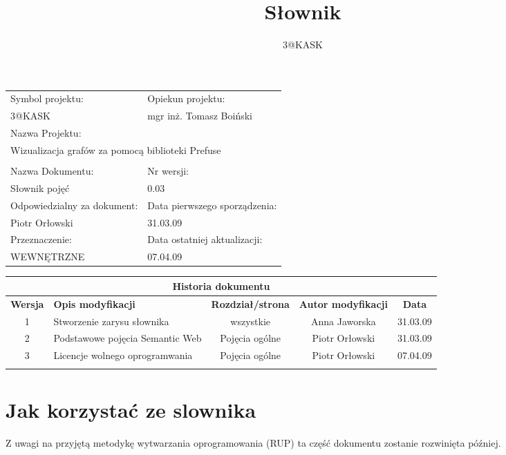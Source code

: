 \documentclass[a4paper,10pt]{article}
\title{Słownik}
\author{3@KASK}
\begin{document}



\maketitle


\begin{center}
\begin{tabular}{|p{7cm}|p{7cm}|}
\hline
Symbol projektu: & Opiekun projektu:   \tabularnewline 
3@KASK & mgr inż. Tomasz Boiński    \tabularnewline \hline
\multicolumn{2}{|l|}{Nazwa Projektu: } \tabularnewline
\multicolumn{2}{|l|}{Wizualizacja grafów za pomocą biblioteki Prefuse } \tabularnewline 
\hline
\multicolumn{2}{l}{ } \tabularnewline %
\hline 
Nazwa Dokumentu: & Nr wersji:   \tabularnewline 
Słownik pojęć & 0.03 \tabularnewline \hline
Odpowiedzialny za dokument: & Data pierwszego sporządzenia:   \tabularnewline 
Piotr Orłowski & 31.03.09 \tabularnewline \hline
Przeznaczenie: & Data ostatniej aktualizacji:   \tabularnewline 
WEWNĘTRZNE & 07.04.09 \tabularnewline \hline
\end{tabular}
\end{center}

\begin{center}
\begin{tabular}{|c|p{4cm}|c|c|c|}
\multicolumn{5}{c}{\textbf{Historia dokumentu}} \tabularnewline \hline
\textbf{Wersja} & \textbf{Opis modyfikacji} & \textbf{Rozdział/strona} & \textbf{Autor modyfikacji} & \textbf{Data} \tabularnewline \hline 
1 & Stworzenie zarysu słownika & wszystkie & Anna Jaworska & 31.03.09 \tabularnewline \hline
2 & Podstawowe pojęcia Semantic Web & Pojęcia ogólne & Piotr Orłowski & 31.03.09 \tabularnewline \hline
3 & Licencje wolnego oprogramwania & Pojęcia ogólne & Piotr Orłowski & 07.04.09 \tabularnewline \hline
& & & &\tabularnewline \hline
\end{tabular}
\end{center}

\newpage
\tableofcontents
\newpage

\section{Jak korzystać ze slownika}
Z uwagi na przyjętą metodykę wytwarzania oprogramowania (RUP) ta część dokumentu zostanie rozwinięta później.
\end{document}
